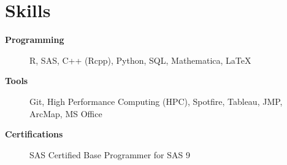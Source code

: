 \section{Skills}

\begin{description}
 \item[\textbf{Programming}] R, SAS, C++ (Rcpp), Python, SQL, Mathematica, \LaTeX
 \item[\textbf{Tools}] Git, High Performance Computing (HPC), Spotfire, Tableau, JMP, ArcMap, MS Office
 \item[\textbf{Certifications}] SAS Certified Base Programmer for SAS 9 
\end{description}